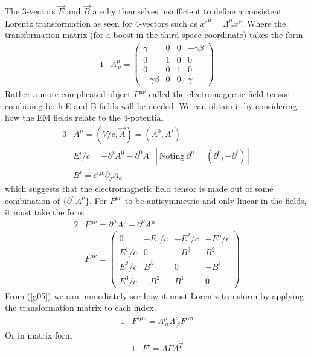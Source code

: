 \documentclass[]{article}
\numberwithin{equation}{subsection}
\begin{document}
\noindent The 3-vectors $\vec{E}$ and $\vec{B}$ are by themselves insufficient to define a consistent Lorentz transformation as seen for 4-vectors such as $x'^{\mu}=\Lambda^{\mu}_{\ \nu}x^{\nu}$. Where the transformation matrix (for a boost in the third space coordinate) takes the form
\begin{alignat}{1}
	\label{g01}	&\Lambda^{\mu}_{\ \nu}=
	\begin{pmatrix}
		\gamma&0&0&-\gamma\beta\\
		0&1&0&0\\
		0&0&1&0\\
		-\gamma\beta&0&0&\gamma
	\end{pmatrix}
\end{alignat}
Rather a more complicated object $F^{\mu\nu}$ called the electromagnetic field tensor combining both E and B fields will be needed.  We can obtain it by considering how the EM fields relate to the 4-potential
\begin{alignat}{3}
	\label{g02}	&A^{\mu} =(V/c,\vec{A})=(A^{0},A^{i})\\
	\label{g03}	&E^{i}/c=-\partial^{i}A^{0}-\partial^{0}A^{i}\ [\mathrm{Noting\ }\partial^{\mu}=(\partial^{0},-\partial^{i})]\\
	\label{g04}	&B^{i}=\epsilon^{ijk}\partial_{j}A_{k}
\end{alignat}
which suggests that the electromagnetic field tensor is made out of some combination of $\{\partial^{\mu}A^{\nu}\}$. For $F^{\mu\nu}$ to be antisymmetric and only linear in the fields, it must take the form
\begin{alignat}{2}
	\label{g05}	&F^{\mu\nu}=\partial^{\mu}A^{\nu}-\partial^{\nu}A^{\mu}\\
	\label{g06}	&F^{\mu\nu}=
	\begin{pmatrix}
		0&-E^{1}/c&-E^{2}/c&-E^{3}/c\\
		E^{1}/c&0&-B^{3}&B^{2}\\
		E^{2}/c&B^{3}&0&-B^{1}\\
		E^{3}/c&-B^{2}&B^{1}&0	
	\end{pmatrix}
\end{alignat}
From (\ref{g05}) we can immediately see how it must Lorentz transform by applying the transformation matrix to each index.
\begin{alignat}{1}
	\label{g07}	&F'^{\mu\nu}=\Lambda^{\mu}_{\ \alpha}\Lambda^{\nu}_{\ \beta}F^{\alpha\beta}
\end{alignat}
Or in matrix form
\begin{alignat}{1}
	\label{g08}	&F'=\Lambda F \Lambda^{T}
\end{alignat}
\end{document}
